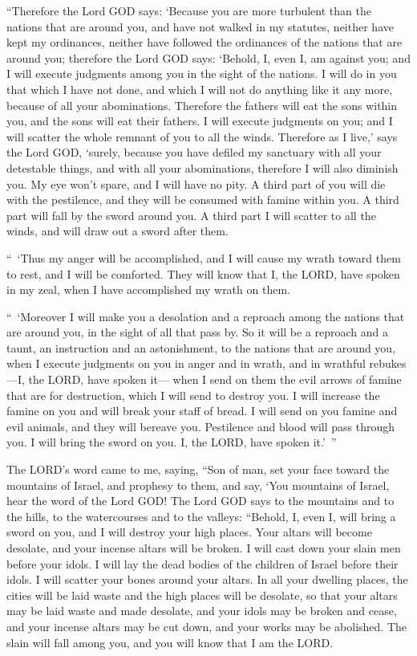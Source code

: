 \myverse{}“Therefore the Lord GOD says: ‘Because you are more turbulent than
the nations that are around you, and have not walked in my statutes, neither have kept my ordinances,
neither have followed the ordinances of the nations that are around you;
\myverse{}therefore the Lord GOD says: ‘Behold, I, even I, am against you; and I will
execute judgments among you in the sight of the nations.
\myverse{}I will do in you that which I have not done, and which I will not do anything
like it any more, because of all your abominations.
\myverse{}Therefore the fathers will eat the sons within you, and the sons will eat
their fathers. I will execute judgments on you; and I will scatter the whole remnant of you to all the
winds.
\myverse{}Therefore as I live,’ says the Lord GOD, ‘surely, because you have defiled
my sanctuary with all your detestable things, and with all your abominations, therefore I will also diminish
you. My eye won’t spare, and I will have no pity.
\myverse{}A third part of you will die with the pestilence, and they will be consumed
with famine within you. A third part will fall by the sword around you. A third part I will scatter to
all the winds, and will draw out a sword after them.

\myverse{}“ ‘Thus my anger will be accomplished, and I will cause my wrath
toward them to rest, and I will be comforted. They will know that I, the LORD, have spoken in my zeal,
when I have accomplished my wrath on them.

\myverse{}“ ‘Moreover I will make you a desolation and a reproach among
the nations that are around you, in the sight of all that pass by.
\myverse{}So it will be a reproach and a taunt, an instruction and an astonishment,
to the nations that are around you, when I execute judgments on you in anger and in wrath, and in wrathful
rebukes—I, the LORD, have spoken it—
\myverse{}when I send on them the evil arrows of famine that are for destruction, which
I will send to destroy you. I will increase the famine on you and will break your staff of bread.
\myverse{}I will send on you famine and evil animals, and they will bereave you. Pestilence
and blood will pass through you. I will bring the sword on you. I, the LORD, have spoken it.’ ”


\mychapter{} \myverse*{}The LORD’s word came to me, saying,
\myverse{}“Son of man, set your face toward the mountains of Israel, and prophesy to them,
\myverse{}and say, ‘You mountains of Israel, hear the word of the Lord GOD! The Lord GOD
says to the mountains and to the hills, to the watercourses and to the valleys: “Behold, I, even I, will
bring a sword on you, and I will destroy your high places.
\myverse{}Your altars will become desolate, and your incense altars will be broken. I
will cast down your slain men before your idols.
\myverse{}I will lay the dead bodies of the children of Israel before their idols. I will
scatter your bones around your altars.
\myverse{}In all your dwelling places, the cities will be laid waste and the high places
will be desolate, so that your altars may be laid waste and made desolate, and your idols may be broken
and cease, and your incense altars may be cut down, and your works may be abolished.
\myverse{}The slain will fall among you, and you will know that I am the LORD.

